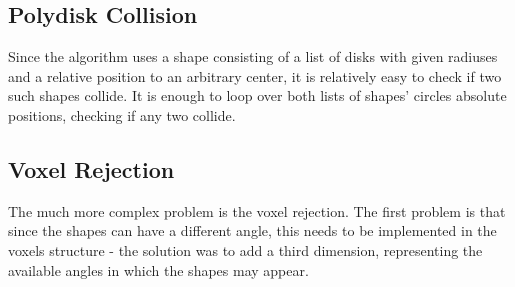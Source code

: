 \documentclass[12pt, oneside]{report}
\begin{document}
\subsection{Polydisk Collision}

Since the algorithm uses a shape consisting of a list of disks with given radiuses and a relative position to an arbitrary center, it is relatively easy to check if two such shapes collide. It is enough to loop over both lists of shapes' circles absolute positions, checking if any two collide. \newline

\subsection{Voxel Rejection}

The much more complex problem is the voxel rejection. The first problem is that since the shapes can have a different angle, this needs to be implemented in the voxels structure - the solution was to add a third dimension, representing the available angles in which the shapes may appear. \newline
\end{document}
